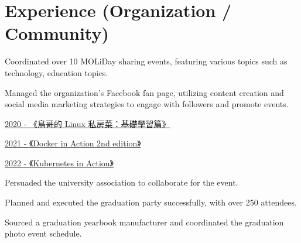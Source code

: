 \documentclass[]{deedy-resume-openfont}
\begin{document}
\hfill
\begin{minipage}[t]{1\textwidth}


\section{Experience (Organization / Community)}
\null\hfill{}
\vspace{\topsep}
\begin{tightemize}
    \item Coordinated over 10 MOLiDay sharing events, featuring various topics such as technology, education topics.
    \item Managed the organization's Facebook fan page, utilizing content creation and social media marketing strategies to engage with followers and promote events.
\end{tightemize}
\sectionsep


\null\hfill{}
\begin{tightemize}
    \item {}\href{https://lsa.moli.rocks/study-circle/docs/2020-11-07}{2020 - 《鳥哥的 Linux 私房菜：基礎學習篇》}
    \item {}\href{https://lsa.moli.rocks/study-circle/docs/docker-1}{2021 - 《Docker in Action 2nd edition》}
    \item {}\href{https://lsa.moli.rocks/study-circle/docs/k8s-1}{2022 - 《Kubernetes in Action》}
\end{tightemize}
\sectionsep

\null\hfill{}
\begin{tightemize}
    \item Persuaded the university association to collaborate for the event.
    \item Planned and executed the graduation party successfully, with over 250 attendees.
    \item Sourced a graduation yearbook manufacturer and coordinated the graduation photo event schedule.
\end{tightemize}
\sectionsep


\end{minipage}
\end{document}
